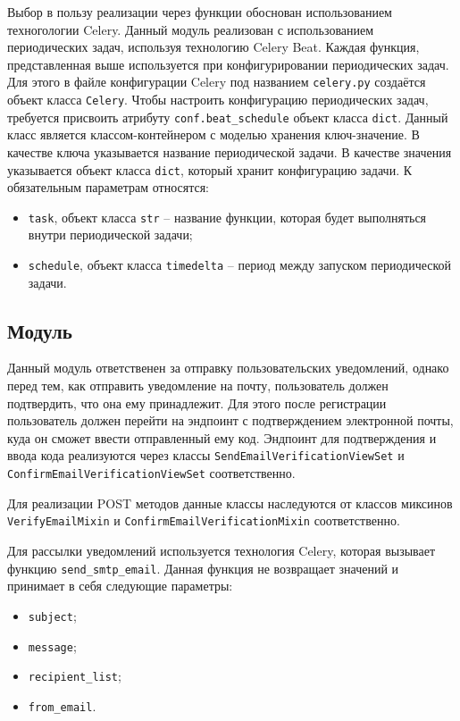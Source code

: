 Выбор в пользу реализации через функции обоснован использованием техногологии Celery.
Данный модуль реализован с использованием периодических задач, используя технологию Celery Beat.
Каждая функция, представленная выше используется при конфигурировании периодических задач.
Для этого в файле конфигурации Celery под названием \lstinline{celery.py} создаётся объект класса \lstinline{Celery}.
Чтобы настроить конфигурацию периодических задач, требуется присвоить атрибуту \lstinline{conf.beat_schedule} объект класса \lstinline{dict}.
Данный класс является классом-контейнером с моделью хранения ключ-значение.
В качестве ключа указывается название периодической задачи.
В качестве значения указывается объект класса \lstinline{dict}, который хранит конфигурацию задачи.
К обязательным параметрам относятся:
\begin{itemize}
    \item \lstinline{task}, объект класса \lstinline{str} -- название функции, которая будет выполняться внутри периодической задачи;
    \item \lstinline{schedule}, объект класса \lstinline{timedelta} -- период между запуском периодической задачи.
\end{itemize}

\subsection{Модуль \moduleNotifications}\label{subsec:func:module-notification}
Данный модуль ответственен за отправку пользовательских уведомлений, однако перед тем, как отправить уведомление на почту, пользователь должен подтвердить, что она ему принадлежит.
Для этого после регистрации пользователь должен перейти на эндпоинт с подтверждением электронной почты, куда он сможет ввести отправленный ему код.
Эндпоинт для подтверждения и ввода кода реализуются через классы \lstinline{SendEmailVerificationViewSet} и \lstinline{ConfirmEmailVerificationViewSet} соответственно.

Для реализации POST методов данные классы наследуются от классов миксинов \lstinline{VerifyEmailMixin} и \lstinline{ConfirmEmailVerificationMixin} соответственно.

Для рассылки уведомлений используется технология Celery, которая вызывает функцию \lstinline{send_smtp_email}.
Данная функция не возвращает значений и принимает в себя следующие параметры:
\begin{itemize}
    \item \lstinline{subject};
    \item \lstinline{message};
    \item \lstinline{recipient_list};
    \item \lstinline{from_email}.
\end{itemize}

